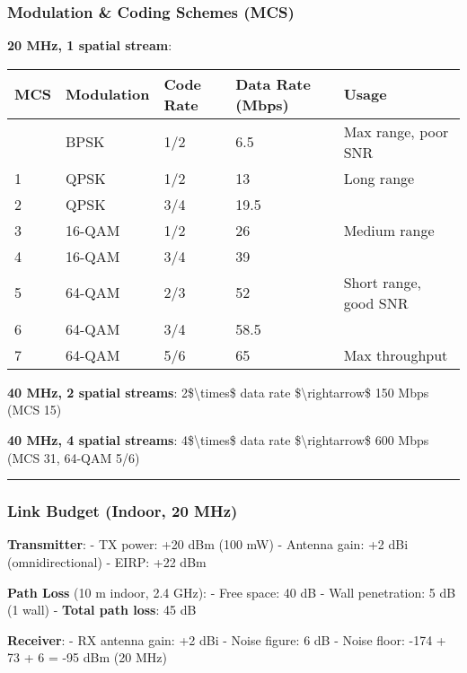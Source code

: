 \subsubsection{Modulation \& Coding Schemes
(MCS)}\label{modulation-coding-schemes-mcs}

\textbf{20 MHz, 1 spatial stream}:

{\def\LTcaptype{} %
\begin{longtable}[]{@{}lllll@{}}
\toprule\noalign{}
MCS & Modulation & Code Rate & Data Rate (Mbps) & Usage \\
\midrule\noalign{}
\endhead
\bottomrule\noalign{}
\endlastfoot
0 & BPSK & 1/2 & 6.5 & Max range, poor SNR \\
1 & QPSK & 1/2 & 13 & Long range \\
2 & QPSK & 3/4 & 19.5 & \\
3 & 16-QAM & 1/2 & 26 & Medium range \\
4 & 16-QAM & 3/4 & 39 & \\
5 & 64-QAM & 2/3 & 52 & Short range, good SNR \\
6 & 64-QAM & 3/4 & 58.5 & \\
7 & 64-QAM & 5/6 & 65 & Max throughput \\
\end{longtable}
}

\textbf{40 MHz, 2 spatial streams}: 2\$\textbackslash times\$ data rate
\$\textbackslash rightarrow\$ 150 Mbps (MCS 15)

\textbf{40 MHz, 4 spatial streams}: 4\$\textbackslash times\$ data rate
\$\textbackslash rightarrow\$ 600 Mbps (MCS 31, 64-QAM 5/6)

\begin{center}\rule{0.5\linewidth}{0.5pt}\end{center}

\subsubsection{Link Budget (Indoor, 20
MHz)}\label{link-budget-indoor-20-mhz}

\textbf{Transmitter}: - TX power: +20 dBm (100 mW) - Antenna gain: +2
dBi (omnidirectional) - EIRP: +22 dBm

\textbf{Path Loss} (10 m indoor, 2.4 GHz): - Free space: 40 dB - Wall
penetration: 5 dB (1 wall) - \textbf{Total path loss}: 45 dB

\textbf{Receiver}: - RX antenna gain: +2 dBi - Noise figure: 6 dB -
Noise floor: -174 + 73 + 6 = -95 dBm (20 MHz)

